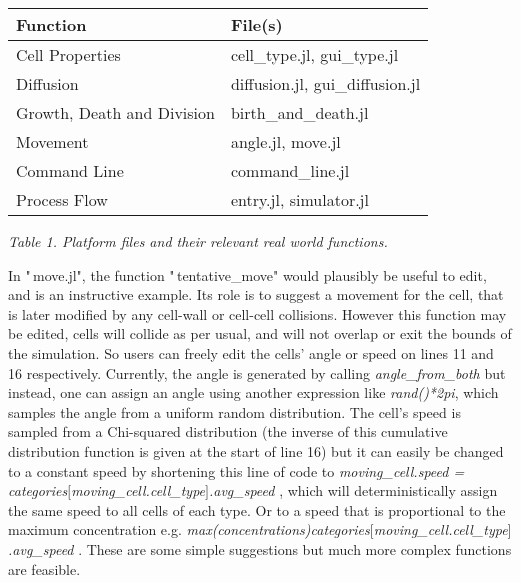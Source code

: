 \documentclass[11.5pt]{article}
\begin{document}
\begin{table}[H]
\centering
\begin{tabular}{|l|l|}
\hline
{\bfseries Function} & {\bfseries File(s)} \\
\hline
Cell Properties & cell\_type.jl, gui\_type.jl \\
\hline
Diffusion & diffusion.jl, gui\_diffusion.jl \\
\hline
Growth, Death and Division & birth\_and\_death.jl \\
\hline
Movement & angle.jl, move.jl \\
\hline
Command Line & command\_line.jl \\
\hline
Process Flow & entry.jl, simulator.jl \\
\hline
\end{tabular}
\end{table}
{\itshape Table 1. Platform files and their relevant real world 
functions.}





In "\,move.jl", the function "\,tentative\_move" would plausibly be 
useful to edit, and is an instructive example. Its role is to suggest a 
movement for the cell, that is later modified by any cell-wall or 
cell-cell collisions. However this function may be edited, cells will 
collide as per usual, and will not overlap or exit the bounds of the 
simulation. So users can freely edit the cells' angle or speed on lines 
11 and 16 respectively. Currently, the angle is generated by calling 
{\itshape angle\_from\_both} but instead, one can assign an angle using 
another expression like {\itshape rand()*2pi}, which samples the angle 
from a uniform random distribution. The cell's speed is sampled from a 
Chi-squared distribution (the inverse of this cumulative distribution 
function is given at the start of line 16) but it can easily be changed 
to a constant speed by shortening this line of code to {\itshape 
moving\_cell.speed = categories$[$moving\_cell.cell\_type$]$.avg\_speed
}, which will deterministically assign the same speed to all cells of 
each type. Or to a speed that is proportional to the maximum 
concentration e.g. {\itshape 
max(concentrations)categories$[$moving\_cell.cell\_type$]$.avg\_speed}
. These are some simple suggestions but much more complex functions are 
feasible.



\begin{figure}[H]
\centering
\end{figure}
\end{document}
